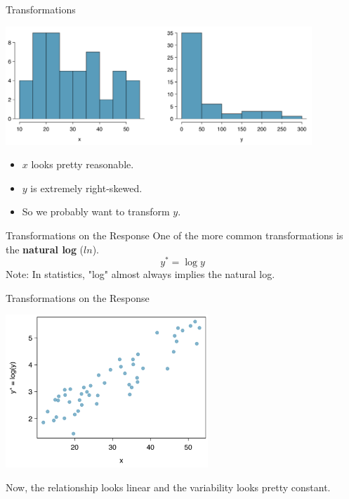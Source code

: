 \begin{frame}{Transformations}
    \begin{center}
        \includegraphics[height=1.75in]{images/histsxy.png}
    \end{center}
    \begin{itemize}
        \item $x$ looks pretty reasonable.
        \item $y$ is extremely right-skewed.
        \item So we probably want to transform $y$.
    \end{itemize}
\end{frame}

\begin{frame}{Transformations on the Response}
    One of the more common transformations is the \textbf{natural log} ($ln$). 
    \[ 
        y^* = \log{y}
    \]
    \vspace{12pt}Note: In statistics, "log" almost always implies the natural log.
\end{frame}

\begin{frame}{Transformations on the Response}
    \begin{center}
        \includegraphics[width=3in]{images/resptrans.png}
    \end{center}
    Now, the relationship looks linear and the variability looks pretty constant.
\end{frame}

